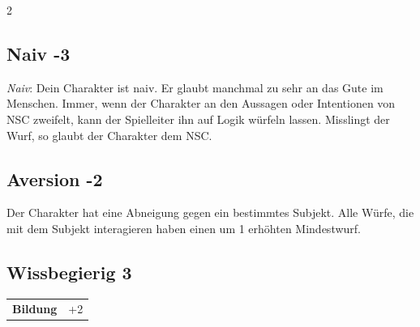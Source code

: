 \begin{multicols}{2}
\begin{tcolorbox}

\end{tcolorbox}

\begin{tcolorbox}
    \subsection*{Naiv \hfill \small{-3 }}
    \tcblower
\textit{Naiv}: Dein Charakter ist naiv. Er glaubt manchmal zu sehr an das Gute im Menschen. Immer, wenn der Charakter an den Aussagen oder Intentionen von NSC zweifelt, kann der Spielleiter ihn auf Logik würfeln lassen. Misslingt der Wurf, so glaubt der Charakter dem NSC.


\vspace{3mm}



\end{tcolorbox}

\begin{tcolorbox}
    \subsection*{Aversion \hfill \small{-2 }}
    \tcblower
Der Charakter hat eine Abneigung gegen ein bestimmtes Subjekt. Alle Würfe, die mit dem Subjekt interagieren haben einen um 1 erhöhten Mindestwurf.


\vspace{3mm}



\end{tcolorbox}

\begin{tcolorbox}
    \subsection*{Wissbegierig \hfill \small{3 }}
    \tcblower




\begin{tabular}{@{}ll@{}}
    \textbf{Bildung} & +2\\
\end{tabular}


\end{tcolorbox}
\end{multicols}
